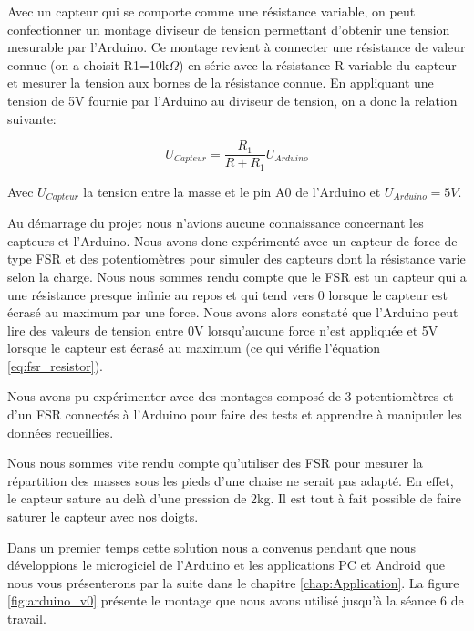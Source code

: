 \documentclass{polytech/polytech}
\begin{document}
Avec un capteur qui se comporte comme une résistance variable, on peut confectionner un montage diviseur de tension permettant d'obtenir une tension mesurable par l'Arduino. Ce montage revient à connecter une résistance de valeur connue (on a choisit R1=10k$\Omega$) en série avec la résistance R variable du capteur et mesurer la tension aux bornes de la résistance connue.  En appliquant une tension de 5V fournie par l'Arduino au diviseur de tension, on a donc la relation suivante:

\begin{equation}
\label{eq:fsr_resistor}
U_{Capteur}= \frac{R_1}{ R + R_1} U_{Arduino} 
\end{equation}
 
 Avec $U_{Capteur}$ la tension entre la masse et le pin A0 de l'Arduino et $U_{Arduino}=5V$.
 
Au démarrage du projet nous n'avions aucune connaissance concernant les capteurs et l'Arduino. Nous avons donc expérimenté avec un capteur de force de type FSR et des potentiomètres pour simuler des capteurs dont la résistance varie selon la charge. Nous nous sommes rendu compte que le FSR est un capteur qui a une résistance presque infinie au repos et qui tend vers 0 lorsque le capteur est écrasé au maximum par une force. Nous avons alors constaté que l'Arduino peut lire des valeurs de tension entre 0V lorsqu'aucune force n'est appliquée et 5V lorsque le capteur est écrasé au maximum (ce qui vérifie l'équation \eqref{eq:fsr_resistor}).

Nous avons pu expérimenter avec des montages composé de 3 potentiomètres et d'un FSR connectés à l'Arduino pour faire des tests et apprendre à manipuler les données recueillies.

Nous nous sommes vite rendu compte qu'utiliser des FSR pour mesurer la répartition des masses sous les pieds d'une chaise ne serait pas adapté. En effet, le capteur sature au delà d'une pression de 2kg. Il est tout à fait possible de faire saturer le capteur avec nos doigts.

Dans un premier temps cette solution nous a convenus pendant que nous développions le microgiciel de l'Arduino et les applications PC et Android que nous vous présenterons par la suite dans le chapitre \ref{chap:Application}. La figure \ref{fig:arduino_v0} présente le montage que nous avons utilisé jusqu'à la séance 6 de travail.
\end{document}
